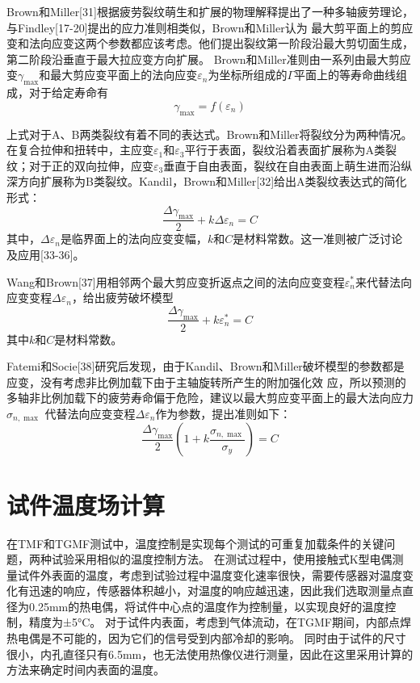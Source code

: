 \documentclass{article}
\begin{document}
Brown和Miller[31]根据疲劳裂纹萌生和扩展的物理解释提出了一种多轴疲劳理论，与Findley[17-20]提出的应力准则相类似，Brown和Miller认为
最大剪平面上的剪应变和法向应变这两个参数都应该考虑。他们提出裂纹第一阶段沿最大剪切面生成，第二阶段沿垂直于最大拉应变方向扩展。
Brown和Miller准则由一系列由最大剪应变${\gamma _{\max }}$和最大剪应变平面上的法向应变${\varepsilon _n}$为坐标所组成的$\Gamma$平面上的等寿命曲线组成，对于给定寿命有
\[{\gamma _{\max }} = f\left( {{\varepsilon _n}} \right)\]

上式对于A、B两类裂纹有着不同的表达式。Brown和Miller将裂纹分为两种情况。在复合拉伸和扭转中，主应变${\varepsilon _1}$和${\varepsilon _3}$平行于表面，裂纹沿着表面扩展称为A类裂纹；对于正的双向拉伸，应变${\varepsilon _3}$垂直于自由表面，裂纹在自由表面上萌生进而沿纵深方向扩展称为B类裂纹。Kandil，Brown和Miller[32]给出A类裂纹表达式的简化形式：
\[\frac{{\Delta {\gamma _{\max }}}}{2} + k\Delta {\varepsilon _n} = C\]
其中，$\Delta {\varepsilon _n}$是临界面上的法向应变变幅，$k$和$C$是材料常数。这一准则被广泛讨论及应用[33-36]。

Wang和Brown[37]用相邻两个最大剪应变折返点之间的法向应变变程${\varepsilon _n^*}$来代替法向应变变程$\Delta {\varepsilon _n}$，给出疲劳破坏模型
\[\frac{{\Delta {\gamma _{\max }}}}{2} + k\varepsilon _n^* = C\]
其中$k$和$C$是材料常数。

Fatemi和Socie[38]研究后发现，由于Kandil、Brown和Miller破坏模型的参数都是应变，没有考虑非比例加载下由于主轴旋转所产生的附加强化效
应，所以预测的多轴非比例加载下的疲劳寿命偏于危险，建议以最大剪应变平面上的最大法向应力${\sigma _{n,\max }}$
代替法向应变变程$\Delta {\varepsilon _n}$作为参数，提出准则如下：
\[\frac{{\Delta {\gamma _{\max }}}}{2}\left( {1 + k\frac{{{\sigma _{n,\max }}}}{{{\sigma _y}}}} \right) = C\]

\section{试件温度场计算}

在TMF和TGMF测试中，温度控制是实现每个测试的可重复加载条件的关键问题，两种试验采用相似的温度控制方法。
在测试过程中，使用接触式K型电偶测量试件外表面的温度，考虑到试验过程中温度变化速率很快，需要传感器对温度变化有迅速的响应，传感器体积越小，对温度的响应越迅速，因此我们选取测量点直径为0.25mm的热电偶，将试件中心点的温度作为控制量，以实现良好的温度控制，精度为±5°C。
对于试件内表面，考虑到气体流动，在TGMF期间，内部点焊热电偶是不可能的，因为它们的信号受到内部冷却的影响。
同时由于试件的尺寸很小，内孔直径只有6.5mm，也无法使用热像仪进行测量，因此在这里采用计算的方法来确定时间内表面的温度。
\end{document}
